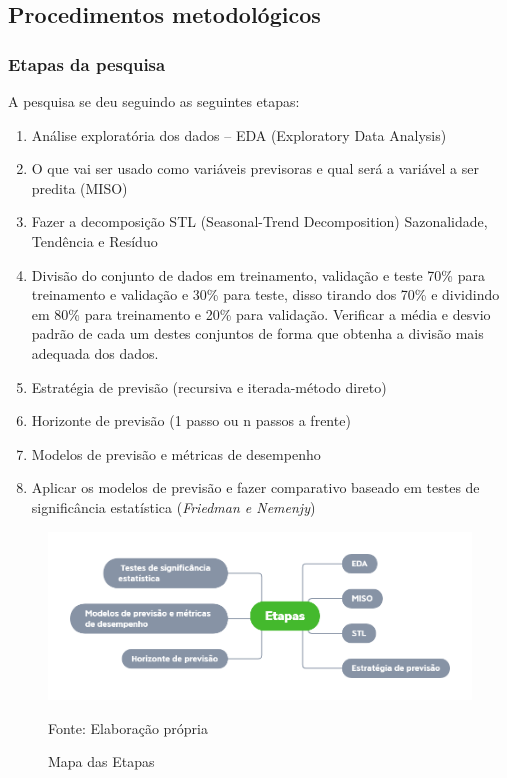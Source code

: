 \subsection{Procedimentos metodológicos} \label{subsec:metod}
   
    \subsubsection{Etapas da pesquisa}\label{subsubsec:etp}
    A pesquisa se deu seguindo as seguintes etapas:
    
    \begin{enumerate}[start=1, label = {\textbf{Etapa} \arabic* } ]
    	\item Análise exploratória dos dados – EDA (Exploratory Data Analysis) \label{etp:1}
    	\item O que vai ser usado como variáveis previsoras e qual será a variável a ser predita (MISO) \label{etp:2}
    	\item Fazer a decomposição STL (Seasonal-Trend Decomposition) Sazonalidade, Tendência e Resíduo \label{etp:3}
    	\item Divisão do conjunto de dados em treinamento, validação e teste 70\% para treinamento e validação e 30\% para teste, disso tirando dos 70\% e dividindo em 80\% para treinamento e 20\% para validação. Verificar a média e desvio padrão de cada um destes conjuntos de forma que obtenha a divisão mais adequada dos dados. \label{etp:4}
    	\item Estratégia de previsão (recursiva e iterada-método direto) \label{etp:5}
    	\item Horizonte de previsão (1 passo ou n passos a frente) \label{etp:6}
    	\item Modelos de previsão e métricas de desempenho \label{etp:7}
    	\item Aplicar os modelos de previsão e fazer comparativo baseado em testes de significância estatística (\textit{Friedman e Nemenjy}) \label{etp:9}
    \end{enumerate}

\begin{figure}[H]
	\centering
	\caption{Mapa das Etapas}
	\label{fig:etapas}
	\includegraphics[width=1\linewidth]{Introducao/Figuras/Etapas}
	
	Fonte: Elaboração própria
\end{figure}




    